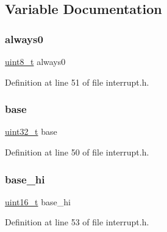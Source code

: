 \subsection{Variable Documentation}
\mbox{\label{a00065_a4a66c700ff7fdb6daca8d968d8d95acf_a4a66c700ff7fdb6daca8d968d8d95acf}} 
\subsubsection{\texorpdfstring{always0}{always0}}
{\footnotesize\ttfamily \hyperlink{a00092_aba7bc1797add20fe3efdf37ced1182c5_aba7bc1797add20fe3efdf37ced1182c5}{uint8\+\_\+t} always0}



Definition at line 51 of file interrupt.\+h.

\mbox{\label{a00065_a0523cedff47e2441fc198b7770ec5d3f_a0523cedff47e2441fc198b7770ec5d3f}} 
\subsubsection{\texorpdfstring{base}{base}}
{\footnotesize\ttfamily \hyperlink{a00092_a435d1572bf3f880d55459d9805097f62_a435d1572bf3f880d55459d9805097f62}{uint32\+\_\+t} base}



Definition at line 50 of file interrupt.\+h.

\mbox{\label{a00065_af85e6d5e4292b0c25c18f701e61d51fa_af85e6d5e4292b0c25c18f701e61d51fa}} 
\subsubsection{\texorpdfstring{base\+\_\+hi}{base\_hi}}
{\footnotesize\ttfamily \hyperlink{a00092_a273cf69d639a59973b6019625df33e30_a273cf69d639a59973b6019625df33e30}{uint16\+\_\+t} base\+\_\+hi}



Definition at line 53 of file interrupt.\+h.

